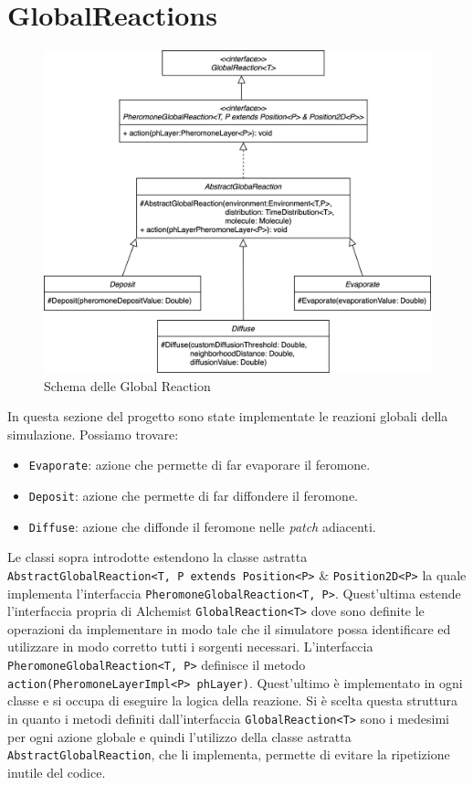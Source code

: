 \section{GlobalReactions}
\begin{figure}[ht]
    \centering
    \includegraphics[width=.7\linewidth]{figures/global.png}
    \caption{Schema delle Global Reaction }\label{fig:global}
\end{figure}
In questa sezione del progetto sono state implementate le reazioni globali della simulazione. Possiamo trovare:
\begin{itemize}
    \item \texttt{Evaporate}: azione che permette di far evaporare il feromone.
    \item \texttt{Deposit}: azione che permette di far diffondere il feromone.
    \item \texttt{Diffuse}: azione che diffonde il feromone nelle \textit{patch} adiacenti.
\end{itemize}
Le classi sopra introdotte estendono la classe astratta \texttt{AbstractGlobalReaction<T, P extends Position<P>}
\& \texttt{Position2D<P>}
la quale implementa l'interfaccia \newline\texttt{PheromoneGlobalReaction<T, P>}. Quest'ultima estende l'interfaccia 
propria di Alchemist \texttt{GlobalReaction<T>} dove sono definite le operazioni da implementare in modo tale che il 
simulatore possa identificare ed utilizzare in modo corretto tutti i sorgenti necessari.
L'interfaccia \texttt{PheromoneGlobalReaction<T, P>} definisce il metodo \texttt{action(PheromoneLayerImpl<P> phLayer)}.
Quest'ultimo è implementato in ogni classe e si occupa di eseguire la logica della reazione.
Si è scelta questa struttura in quanto i metodi definiti dall'interfaccia \texttt{GlobalReaction<T>}
sono i medesimi per ogni azione globale e quindi l'utilizzo della classe astratta \texttt{AbstractGlobalReaction},
che li implementa, permette di evitare la ripetizione inutile del codice.

